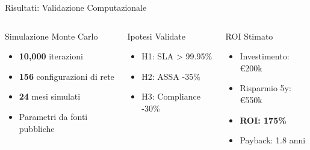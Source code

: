\documentclass[aspectratio=169,10pt]{beamer}
\begin{document}
\begin{frame}{Risultati: Validazione Computazionale}
\begin{columns}[T]
\begin{block}{Simulazione Monte Carlo}
\begin{itemize}
    \item \textbf{10,000} iterazioni
    \item \textbf{156} configurazioni di rete
    \item \textbf{24} mesi simulati
    \item Parametri da fonti pubbliche
\end{itemize}
\end{block}


\begin{alertblock}{Ipotesi Validate}
\begin{itemize}
    \item[\checkmark] H1: SLA > 99.95\%
    \item[\checkmark] H2: ASSA -35\%
    \item[\checkmark] H3: Compliance -30\%
\end{itemize}
\end{alertblock}

\begin{exampleblock}{ROI Stimato}
\begin{itemize}
    \item Investimento: €200k
    \item Risparmio 5y: €550k
    \item \textbf{ROI: 175\%}
    \item Payback: 1.8 anni
\end{itemize}
\end{exampleblock}
\end{columns}
\end{frame}
\end{document}
